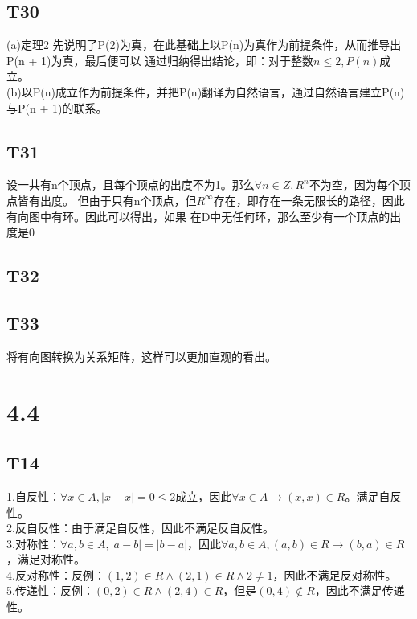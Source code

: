 \documentclass{article}
\begin{document}
\subsection{T30} 
(a)定理2 先说明了P(2)为真，在此基础上以P(n)为真作为前提条件，从而推导出P(n + 1)为真，最后便可以
通过归纳得出结论，即：对于整数$n \leq 2,P(n)$成立。\\
(b)以P(n)成立作为前提条件，并把P(n)翻译为自然语言，通过自然语言建立P(n)与P(n + 1)的联系。
\subsection{T31}
设一共有n个顶点，且每个顶点的出度不为1。那么$\forall n \in Z, R^n$不为空，因为每个顶点皆有出度。
但由于只有n个顶点，但$R^{\infty}$存在，即存在一条无限长的路径，因此有向图中有环。因此可以得出，如果
在D中无任何环，那么至少有一个顶点的出度是0
\subsection{T32}
\subsection{T33}
将有向图转换为关系矩阵，这样可以更加直观的看出。
\section{4.4}
\subsection{T14}
1.自反性：$\forall x \in A, |x - x| = 0 \leq 2$成立，因此$\forall x \in A \rightarrow (x, x)\in R$。满足自反性。\\
2.反自反性：由于满足自反性，因此不满足反自反性。\\
3.对称性：$\forall a, b\in A, |a - b| = |b - a|$，因此$\forall a, b \in A, (a, b)\in R \rightarrow (b, a) \in R$，满足对称性。\\
4.反对称性：反例：$(1, 2) \in R \land (2, 1) \in R \land 2 \neq 1$，因此不满足反对称性。\\
5.传递性：反例：$(0, 2) \in R \land (2, 4) \in R$，但是$(0, 4) \notin R$，因此不满足传递性。\\
\end{document}
